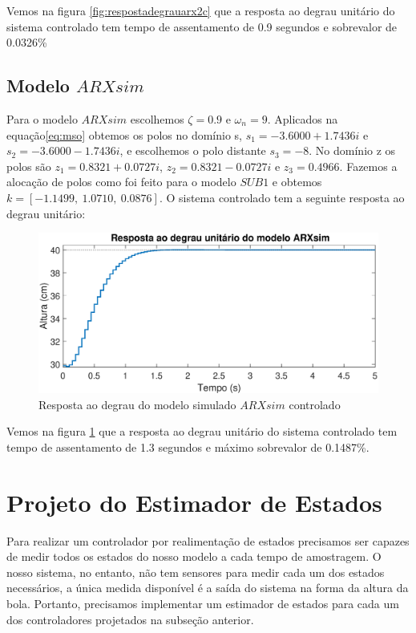 Vemos na figura \ref{fig:respostadegrauarx2c} que a resposta ao degrau unitário do sistema controlado tem tempo de assentamento de 0.9 segundos e sobrevalor de 0.0326\%


\subsection{Modelo $ARXsim$}\label{s:ctrlarxsim}

Para o modelo $ARXsim$ escolhemos $\zeta=0.9$ e $\omega_n=9$. Aplicados na equação\eqref{eq:mso} obtemos os polos no domínio s, $s_1=-3.6000 + 1.7436i$ e $s_2=-3.6000 - 1.7436i$, e escolhemos o polo distante $s_3=-8$. No domínio z os polos são $z_1=0.8321 + 0.0727i$, $z_2=0.8321 - 0.0727i$ e $z_3=0.4966$. Fazemos a alocação de polos como foi feito para o modelo $SUB1$ e obtemos $k=[-1.1499,~1.0710,~0.0876]$.
O sistema controlado tem a seguinte resposta ao degrau unitário:

\begin{figure}[H]
	\centering
	\includegraphics[width=1\linewidth]{respostadegrauarxsimc}
	\caption[Resposta ao degrau do modelo simulado $ARXsim$]{Resposta ao degrau do modelo simulado $ARXsim$ controlado}
	\label{fig:respostadegrauarxsimc}
\end{figure}

Vemos na figura \ref{fig:respostadegrauarxsimc} que a resposta ao degrau unitário do sistema controlado tem tempo de assentamento de 1.3 segundos e máximo sobrevalor de 0.1487\%.


\section{Projeto do Estimador de Estados}\label{s5:est}
Para realizar um controlador por realimentação de estados precisamos ser capazes de medir todos os estados do nosso modelo a cada tempo de amostragem. O nosso sistema, no entanto, não tem sensores para medir cada um dos estados necessários, a única medida disponível é a saída do sistema na forma da altura da bola. Portanto, precisamos implementar um estimador de estados para cada um dos controladores projetados na subseção anterior.

